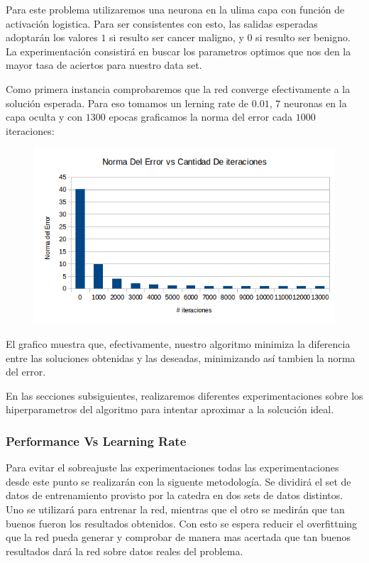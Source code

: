 
Para este problema utilizaremos una neurona en la ulima capa con función de activación logistica. Para ser consistentes con esto, las salidas esperadas adoptarán los valores $1$ si resulto ser cancer maligno, y $0$ si resulto ser benigno. La experimentación consistirá en buscar los parametros optimos que nos den la mayor tasa de aciertos para nuestro data set.

Como primera instancia comprobaremos que la red converge efectivamente a la solución esperada. Para eso tomamos un lerning rate de $0.01$, $7$ neuronas en la capa oculta y con $1300$ epocas graficamos la norma del error cada $1000$ iteraciones:

\begin{figure}[h!]
  \centering
    \includegraphics[scale=0.4]{ej1/convergencia.png}
\end{figure}

El grafico muestra que, efectivamente, nuestro algoritmo minimiza la diferencia entre las soluciones obtenidas y las deseadas, minimizando así tambien la norma del error.

En las secciones subsiguientes, realizaremos diferentes experimentaciones sobre los hiperparametros del algoritmo para intentar aproximar a la solcución ideal.

\subsubsection{Performance Vs Learning Rate} 

Para evitar el sobreajuste las experimentaciones todas las experimentaciones desde este punto se realizarán con la siguente metodología. Se dividirá el set de datos de entrenamiento provisto por la catedra en dos sets de datos distintos. Uno se utilizará para entrenar la red, mientras que el otro se medirán que tan buenos fueron los resultados obtenidos. Con esto se espera reducir el overfittning que la red pueda generar y comprobar de manera mas acertada que tan buenos resultados dará la red sobre datos reales del problema.

